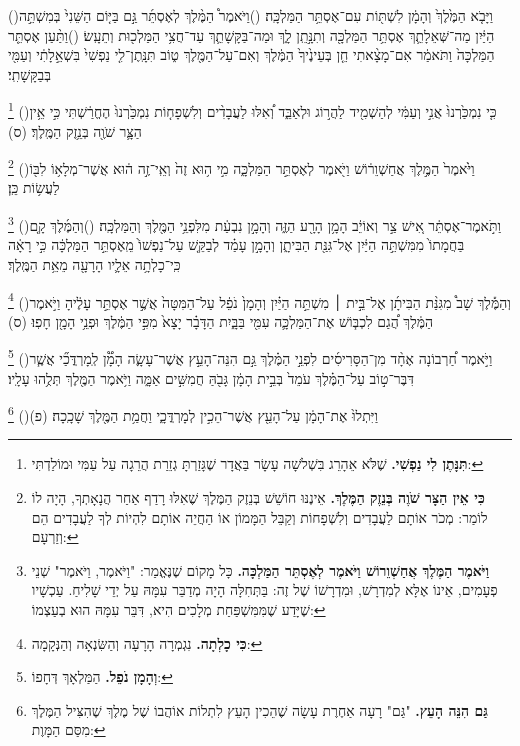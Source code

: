 \documentclass[12pt, openany]{book}
\newcommand{\footnotecomment}[1]{
	\renewcommand\thefootnote{}
	\footnote{\textsf{#1}}}
\newcommand{\commenta}[1]{\footnotecomment{#1}\hspace{0em}}
\newcommand{\vsnum}[1]{(\hebrewnumeral{#1})\space}
\begin{document}
\begin{multicols}{2}
\vsnum{1}וַיָּבֹ֤א הַמֶּ֙לֶךְ֙ וְהָמָ֔ן לִשְׁתּ֖וֹת עִם־אֶסְתֵּ֥ר הַמַּלְכָּֽה׃
\vsnum{2}וַיֹּאמֶר֩ הַמֶּ֨לֶךְ לְאֶסְתֵּ֜ר גַּ֣ם בַּיּ֤וֹם הַשֵּׁנִי֙ בְּמִשְׁתֵּ֣ה הַיַּ֔יִן מַה־שְּׁאֵלָתֵ֛ךְ אֶסְתֵּ֥ר הַמַּלְכָּ֖ה וְתִנָּ֣תֵֽן לָ֑ךְ וּמַה־בַּקָּשָׁתֵ֛ךְ עַד־חֲצִ֥י הַמַּלְכ֖וּת וְתֵעָֽשׂ׃
\vsnum{3}וַתַּ֨עַן אֶסְתֵּ֤ר הַמַּלְכָּה֙ וַתֹּאמַ֔ר אִם־מָצָ֨אתִי חֵ֤ן בְּעֵינֶ֙יךָ֙ הַמֶּ֔לֶךְ וְאִם־עַל־הַמֶּ֖לֶךְ ט֑וֹב תִּנָּֽתֶן־לִ֤י נַפְשִׁי֙ בִּשְׁאֵ֣לָתִ֔י וְעַמִּ֖י בְּבַקָּשָׁתִֽי׃%
\commenta{\textrm{\textbf{תִּנָּתֶן לִי נַפְשִׁי.}} שֶׁלֹּא אֵהָרֵג בִּשְׁלשָׁה עָשָׂר בַּאֲדָר שֶׁגָּזַרְתָּ גְזֵרַת הֲרֵגָה עַל עַמִּי וּמוֹלַדְתִּי:}%
\vsnum{4}כִּ֤י נִמְכַּ֙רְנוּ֙ אֲנִ֣י וְעַמִּ֔י לְהַשְׁמִ֖יד לַהֲר֣וֹג וּלְאַבֵּ֑ד וְ֠אִלּוּ לַעֲבָדִ֨ים וְלִשְׁפָח֤וֹת נִמְכַּ֙רְנוּ֙ הֶחֱרַ֔שְׁתִּי כִּ֣י אֵ֥ין הַצָּ֛ר שֹׁוֶ֖ה בְּנֵ֥זֶק הַמֶּֽלֶךְ׃ (ס)%
\commenta{\textrm{\textbf{כִּי אֵין הַצָּר שֹׁוֶה בְּנֵזֶק הַמֶּלֶךְ.}} אֵינֶנּוּ חוֹשֵׁשׁ בְּנֵזֶק הַמֶּלֶךְ שֶׁאִלּוּ רָדַף אַחַר הֲנָאָתְךָ, הָיָה לוֹ לוֹמַר: מְכֹר אוֹתָם לַעֲבָדִים וְלִשְׁפָחוֹת וְקַבֵּל הַמָּמוֹן אוֹ הַחֲיֵה אוֹתָם לִהְיוֹת לְךָ לַעֲבָדִים הֵם וְזַרְעָם: }%
\vsnum{5}וַיֹּ֙אמֶר֙ הַמֶּ֣לֶךְ אֲחַשְׁוֵר֔וֹשׁ וַיֹּ֖אמֶר לְאֶסְתֵּ֣ר הַמַּלְכָּ֑ה מִ֣י ה֥וּא זֶה֙ וְאֵֽי־זֶ֣ה ה֔וּא אֲשֶׁר־מְלָא֥וֹ לִבּ֖וֹ לַעֲשׂ֥וֹת כֵּֽן׃%
\commenta{\textrm{\textbf{וַיֹּאמֶר הַמֶּלֶךְ אֲחַשְׁוֵרוֹשׁ וַיֹּאמֶר לְאֶסְתֵּר הַמַּלְכָּה.}} כָּל מָקוֹם שֶׁנֶּאֱמַר: "וַיֹּאמֶר, וַיֹּאמֶר" שְׁנֵי פְעָמִים, אֵינוֹ אֶלָּא לְמִדְרָשׁ, וּמִדְרָשׁוֹ שֶׁל זֶה: בַּתְּחִלָּה הָיָה מְדַבֵּר עִמָּהּ עַל יְדֵי שָׁלִיחַ. עַכְשָׁיו שֶׁיָּדַע שֶׁמִּמִּשְׁפַּחַת מְלָכִים הִיא, דִּבֵּר עִמָּהּ הוּא בְעַצְמוֹ: }%
\vsnum{6}וַתֹּ֣אמֶר־אֶסְתֵּ֔ר אִ֚ישׁ צַ֣ר וְאוֹיֵ֔ב הָמָ֥ן הָרָ֖ע הַזֶּ֑ה וְהָמָ֣ן נִבְעַ֔ת מִלִּפְנֵ֥י הַמֶּ֖לֶךְ וְהַמַּלְכָּֽה׃
\vsnum{7}וְהַמֶּ֜לֶךְ קָ֤ם בַּחֲמָתוֹ֙ מִמִּשְׁתֵּ֣ה הַיַּ֔יִן אֶל־גִּנַּ֖ת הַבִּיתָ֑ן וְהָמָ֣ן עָמַ֗ד לְבַקֵּ֤שׁ עַל־נַפְשׁוֹ֙ מֵֽאֶסְתֵּ֣ר הַמַּלְכָּ֔ה כִּ֣י רָאָ֔ה כִּֽי־כָלְתָ֥ה אֵלָ֛יו הָרָעָ֖ה מֵאֵ֥ת הַמֶּֽלֶךְ׃%
\commenta{\textrm{\textbf{כִּי כָלְתָה.}} נִגְמְרָה הָרָעָה וְהַשִּׂנְאָה וְהַנְּקָמָה:}%
\vsnum{8}וְהַמֶּ֡לֶךְ שָׁב֩ מִגִּנַּ֨ת הַבִּיתָ֜ן אֶל־בֵּ֣ית ׀ מִשְׁתֵּ֣ה הַיַּ֗יִן וְהָמָן֙ נֹפֵ֔ל עַל־הַמִּטָּה֙ אֲשֶׁ֣ר אֶסְתֵּ֣ר עָלֶ֔יהָ וַיֹּ֣אמֶר הַמֶּ֔לֶךְ הֲ֠גַם לִכְבּ֧וֹשׁ אֶת־הַמַּלְכָּ֛ה עִמִּ֖י בַּבָּ֑יִת הַדָּבָ֗ר יָצָא֙ מִפִּ֣י הַמֶּ֔לֶךְ וּפְנֵ֥י הָמָ֖ן חָפֽוּ׃ (ס)%
\commenta{\textrm{\textbf{וְהָמָן נֹפֵל.}} הַמַּלְאָךְ דְּחָפוֹ:}%
\vsnum{9}וַיֹּ֣אמֶר חַ֠רְבוֹנָה אֶחָ֨ד מִן־הַסָּרִיסִ֜ים לִפְנֵ֣י הַמֶּ֗לֶךְ גַּ֣ם הִנֵּה־הָעֵ֣ץ אֲשֶׁר־עָשָׂ֪ה הָמָ֟ן לְֽמָרְדֳּכַ֞י אֲשֶׁ֧ר דִּבֶּר־ט֣וֹב עַל־הַמֶּ֗לֶךְ עֹמֵד֙ בְּבֵ֣ית הָמָ֔ן גָּבֹ֖הַּ חֲמִשִּׁ֣ים אַמָּ֑ה וַיֹּ֥אמֶר הַמֶּ֖לֶךְ תְּלֻ֥הוּ עָלָֽיו׃%
\commenta{\textrm{\textbf{גַּם הִנֵּה הָעֵץ.}} "גַּם" רָעָה אַחֶרֶת עָשָׂה שֶׁהֵכִין הָעֵץ לִתְלוֹת אוֹהֲבוֹ שֶׁל מֶלֶךְ שֶׁהִצִּיל הַמֶּלֶךְ מִסַּם הַמָּוֶת: }%
\vsnum{10}וַיִּתְלוּ֙ אֶת־הָמָ֔ן עַל־הָעֵ֖ץ אֲשֶׁר־הֵכִ֣ין לְמָרְדֳּכָ֑י וַחֲמַ֥ת הַמֶּ֖לֶךְ שָׁכָֽכָה׃ (פ)
\end{multicols}\newpage
\end{document}
